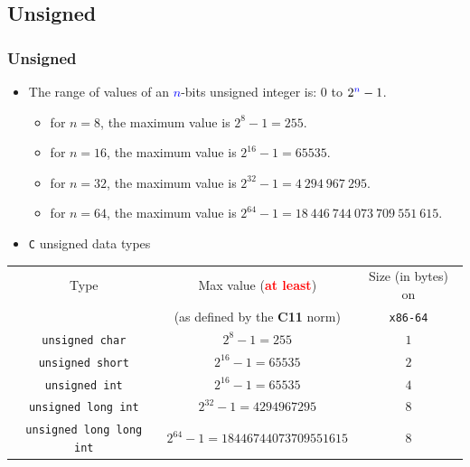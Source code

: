 \documentclass{beamer}
\begin{document}
\subsection{Unsigned}

\begin{frame}%
\frametitle{Unsigned}

\scriptsize

\begin{itemize}

\item The range of values of an \textcolor{blue}{$n$}-bits unsigned integer is: $0$ to $2^{\textcolor{blue}{n}} - 1$.

  \begin{itemize}
    \scriptsize
  \item for $n = 8$, the maximum value is $2^{8} - 1 = 255$.
  \item for $n = 16$, the maximum value is $2^{16} - 1 = 65535$.
  \item for $n = 32$, the maximum value is $2^{32} - 1 = 4\ 294\ 967\ 295$.
  \item for $n = 64$, the maximum value is $2^{64} - 1 = 18\ 446\ 744\ 073\ 709\ 551\ 615$.\\
  \end{itemize}

  \vspace{0.4cm}

\item \texttt{C} unsigned data types\\
\end{itemize}

\begin{center}
\begin{tabular}{|c|c|c|}
    \hline
    Type & Max value (\textcolor{red}{\textbf{at least}}) & Size (in bytes) on \\
    & (as defined by the \textbf{C11} norm) & \texttt{x86-64}\\
    \hline
    \hline
    \lstinline{unsigned char} & $2^8 - 1 = 255$ & $1$ \bigstrut \\
    \hline
    \lstinline{unsigned short} & $2^{16} - 1 = 65535$ & $2$ \bigstrut\\
    \hline
    \lstinline{unsigned int} & $2^{16} - 1 = 65535$ & $4$ \bigstrut\\
    \hline
    \lstinline{unsigned long int} & $2^{32} - 1 = 4294967295$ & $8$ \bigstrut\\
    \hline
    \lstinline{unsigned long long int} & $2^{64} - 1 = 18446744073709551615$ & $8$ \bigstrut\\
    \hline
  \end{tabular}
\end{center}

\end{frame}
\end{document}

